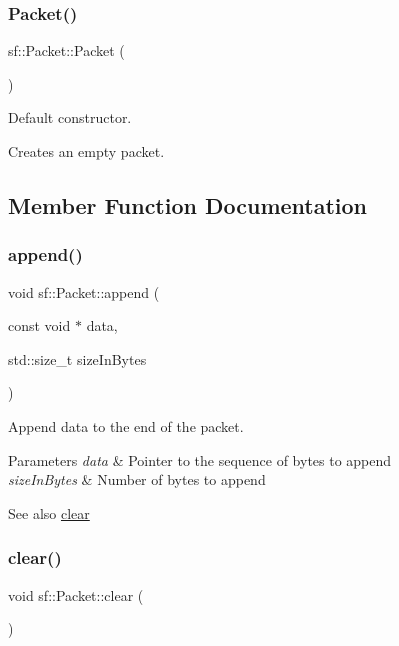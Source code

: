 \subsubsection{\texorpdfstring{Packet()}{Packet()}}
{\footnotesize\ttfamily sf\+::\+Packet\+::\+Packet (\begin{DoxyParamCaption}{ }\end{DoxyParamCaption})}



Default constructor. 

Creates an empty packet. 

\subsection{Member Function Documentation}
\mbox{\label{classsf_1_1_packet_a7dd6e429b87520008326c4d71f1cf011}} 
\subsubsection{\texorpdfstring{append()}{append()}}
{\footnotesize\ttfamily void sf\+::\+Packet\+::append (\begin{DoxyParamCaption}\item[{const void $\ast$}]{data,  }\item[{std\+::size\+\_\+t}]{size\+In\+Bytes }\end{DoxyParamCaption})}



Append data to the end of the packet. 


\begin{DoxyParams}{Parameters}
{\em data} & Pointer to the sequence of bytes to append \\
\hline
{\em size\+In\+Bytes} & Number of bytes to append\\
\hline
\end{DoxyParams}
\begin{DoxySeeAlso}{See also}
\hyperlink{classsf_1_1_packet_a133ea8b8fe6e93c230f0d79f19a3bf0d}{clear} 
\end{DoxySeeAlso}
\mbox{\label{classsf_1_1_packet_a133ea8b8fe6e93c230f0d79f19a3bf0d}} 
\subsubsection{\texorpdfstring{clear()}{clear()}}
{\footnotesize\ttfamily void sf\+::\+Packet\+::clear (\begin{DoxyParamCaption}{ }\end{DoxyParamCaption})}



